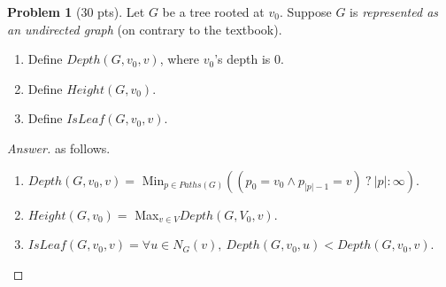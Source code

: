 \documentclass[11pt,a4paper,oneside,microtype,nokorean]{oblivoir}
\theoremstyle{definition}
\newtheorem{problem}{Problem}
\begin{document}
\begin{problem}[30 pts]
  Let $G$ be a tree rooted at $v_0$.  Suppose $G$ is \emph{represented as an undirected graph} (on
  contrary to the textbook).

  \begin{enumerate}
  \item Define $Depth(G, v_0, v)$, where $v_0$'s depth is 0.
  \item Define $Height(G, v_0)$.
  \item Define $IsLeaf(G, v_0, v)$.
  \end{enumerate}
\end{problem}
\begin{proof}[Answer] as follows.

  \begin{enumerate}
  \item $Depth(G, v_0, v) =$ Min$_{p \in Paths(G)}((p_0 = v_0 \land p_{|p|-1} = v)\ ?\ |p| : \infty)$.
  \item $Height(G, v_0) =$ Max$_{v \in V}Depth(G,V_0,v)$.
  \item $IsLeaf(G,v_0,v) = \forall u \in N_{G}(v),\ Depth(G,v_0,u) < Depth(G,v_0,v)$.

  \end{enumerate}
\end{proof}
\end{document}
